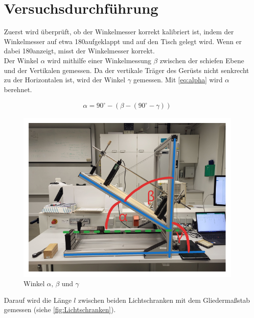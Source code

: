 \section{Versuchsdurchführung}

Zuerst wird überprüft, ob der Winkelmesser korrekt kalibriert ist, indem der Winkelmesser auf etwa 180\textdegree aufgeklappt und auf den Tisch gelegt wird. Wenn er dabei 180\textdegree anzeigt, misst der Winkelmesser korrekt. \\
Der Winkel $\alpha$ wird mithilfe einer Winkelmessung $\beta$ zwischen der schiefen Ebene und der Vertikalen gemessen. Da der vertikale Träger des Gerüsts nicht senkrecht zu der Horizontalen ist, wird der Winkel $\gamma$ gemessen. Mit \autoref{eq:alpha} wird $\alpha$ berehnet.

\begin{align}
    \alpha = 90^\circ - (\beta - (90^\circ - \gamma))
    \label{eq:alpha}
\end{align}

\begin{figure}[ht]
    \centering
    \includegraphics{images/Versuch-Winkel.pdf}
    \caption[Winkelmessung]{Winkel $\alpha$, $\beta$ und $\gamma$}
    \label{fig:Winkelmessung}
\end{figure}

Darauf wird die Länge $l$ zwischen beiden Lichtschranken mit dem Gliedermaßstab gemessen (siehe \autoref{fig:Lichtschranken}).\\

